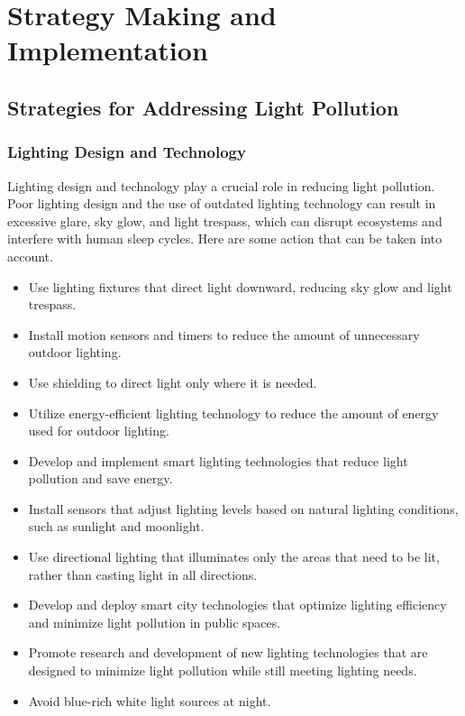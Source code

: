 \MinParskip{}

\section{Strategy Making and Implementation}



\subsection{Strategies for Addressing Light Pollution}

\subsubsection{Lighting Design and Technology}

Lighting design and technology play a crucial role in reducing light pollution. Poor lighting design and the use of outdated lighting technology can result in excessive glare, sky glow, and light trespass, which can disrupt ecosystems and interfere with human sleep cycles. Here are some action that can be taken into account.

\begin{itemize}
    \item Use lighting fixtures that direct light downward, reducing sky glow and light trespass.
    
    \item Install motion sensors and timers to reduce the amount of unnecessary outdoor lighting.
    
    \item Use shielding to direct light only where it is needed.
    
    \item Utilize energy-efficient lighting technology to reduce the amount of energy used for outdoor lighting.

    \item Develop and implement smart lighting technologies that reduce light pollution and save energy.
    
    \item Install sensors that adjust lighting levels based on natural lighting conditions, such as sunlight and moonlight.
    
    \item Use directional lighting that illuminates only the areas that need to be lit, rather than casting light in all directions.
    
    \item Develop and deploy smart city technologies that optimize lighting efficiency and minimize light pollution in public spaces.
    
    \item Promote research and development of new lighting technologies that are designed to minimize light pollution while still meeting lighting needs.

    \item Avoid blue-rich white light sources at night. 

\end{itemize}

